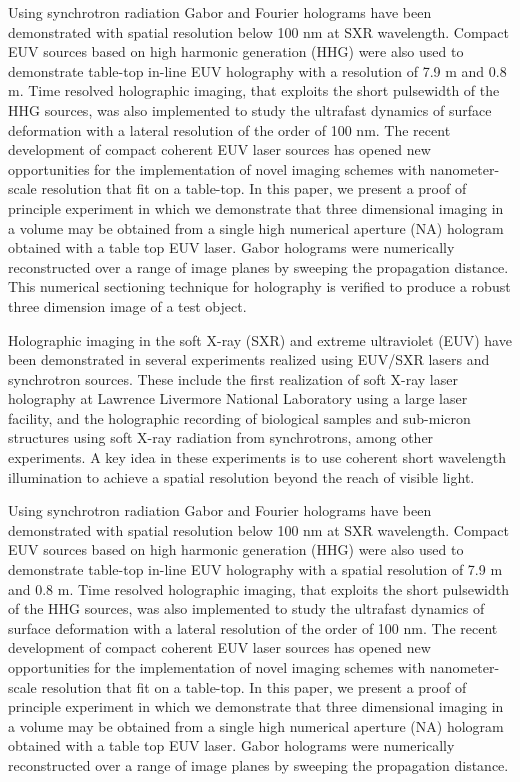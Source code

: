 \documentclass[]{IEEEphot}
\begin{document}
Using synchrotron radiation Gabor and Fourier holograms have been demonstrated with spatial resolution below 100 nm at SXR wavelength.  Compact EUV sources based on high harmonic generation (HHG) were also used to demonstrate table-top in-line EUV holography with a  resolution of 7.9 m and 0.8 m.  Time resolved holographic imaging, that exploits the short pulsewidth of the HHG sources, was also implemented to study the ultrafast dynamics of surface deformation with a lateral resolution of the order of 100 nm.  The recent development of compact coherent EUV laser sources has opened new opportunities for the implementation of novel imaging schemes with nanometer-scale resolution that fit on a table-top. In this paper, we present a proof of principle experiment in which we demonstrate that three dimensional imaging in a volume may be obtained from a single high numerical  aperture (NA) hologram obtained with a table top EUV laser. Gabor holograms were numerically reconstructed over a range of image planes by sweeping the propagation distance. This numerical sectioning technique for holography is verified to produce a robust three dimension image of a test object.  

Holographic imaging in the soft X-ray (SXR) and extreme ultraviolet (EUV) have been demonstrated in several experiments realized using EUV/SXR lasers and synchrotron sources. These include the first realization of soft X-ray laser holography at Lawrence Livermore National Laboratory using a large laser facility, and the holographic recording of biological samples and sub-micron structures using soft X-ray radiation from synchrotrons, among other experiments.  A key idea in these experiments is to use coherent short wavelength illumination to achieve a spatial resolution beyond the reach of visible light.  

Using synchrotron radiation Gabor and Fourier holograms have been demonstrated with spatial resolution below 100 nm at SXR wavelength.  Compact EUV sources based on high harmonic generation (HHG) were also used to demonstrate table-top in-line EUV holography with a spatial resolution of 7.9 m and 0.8 m.  Time resolved holographic imaging, that exploits the short pulsewidth of the HHG sources, was also implemented to study the ultrafast dynamics of surface deformation with a lateral resolution of the order of 100 nm.  The recent development of compact coherent EUV laser sources has opened new opportunities for the implementation of novel imaging schemes with nanometer-scale resolution that fit on a table-top. In this paper, we present a proof of principle experiment in which we demonstrate that three dimensional imaging in a volume may be obtained from a single high numerical  aperture (NA) hologram obtained with a table top EUV laser. Gabor holograms were numerically reconstructed over a range of image planes by sweeping the propagation distance. 
\end{document}
